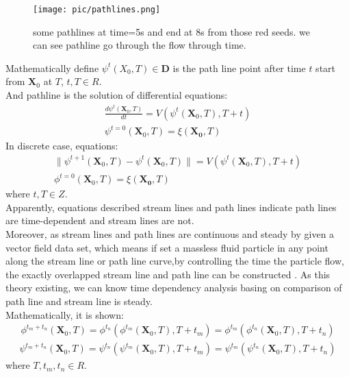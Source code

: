 \documentclass[
     11pt,         %
     a4paper,      %
     oneside,
     ]{article}
\newcommand{\vect}[1]{\boldsymbol{#1}}
\begin{document}
	\begin{figure}[H]
			\centering
			\texttt{[image: pic/pathlines.png]}
			\caption{{\tiny some pathlines at time=5s and end at 8s from those red seeds. we can see pathline go through the flow through time.}}
			\label{fig:pathlineatfrom5s}
		\end{figure}
	Mathematically define $\psi^{t}(X_{0},T)\in\vect{D}$ is the path line point after time $t$ start from $\vect{X}_{0}$ at $T$, $t,T\in R$.\\
	And pathline is the solution of differential equations:\\
    \begin{eqnarray}
    \frac{d\psi^{t}(\vect{X}_{0},T)}{dt}=V(\psi^{t}(\vect{X}_{0},T),T+t)\\
    \psi^{t=0}(\vect{X}_{0},T)=\xi(\vect{X_{0}},T)
    \end{eqnarray}
    In discrete case, equations:\\
    \begin{eqnarray}
    \lVert\psi^{t+1}(\vect{X}_{0},T)-\psi^{t}(\vect{X}_{0},T)\rVert=V(\psi^{t}(\vect{X}_{0},T),T+t)\\
    \phi^{t=0}(\vect{X}_{0},T)=\xi(\vect{X_{0}},T)
    \end{eqnarray}
    where $t,T\in Z$.\\ 
    Apparently, equations described stream lines and path lines indicate path lines are time-dependent and stream lines are not.\\
	Moreover, as stream lines and path lines are continuous and steady by given a vector field data set, which means if set a massless fluid particle in any point along the stream line or path line curve,by controlling the time the particle flow, the exactly overlapped stream line and path line can be constructed . As this theory existing, we can know time dependency analysis basing on comparison of path line and stream line is steady.\\
	Mathematically, it is shown:\\
	\begin{eqnarray}
	\phi^{t_{m}+t_{n}}(\vect{X}_{0},T)=\phi^{t_{n}}(\phi^{t_{m}}(\vect{X}_{0},T),T+t_{m})=\phi^{t_{m}}(\phi^{t_{n}}(\vect{X}_{0},T),T+t_{n})
	\end{eqnarray}
	\begin{eqnarray}
	\psi^{t_{m}+t_{n}}(\vect{X}_{0},T)=\psi^{t_{n}}(\psi^{t_{m}}(\vect{X}_{0},T),T+t_{m})=\psi^{t_{m}}(\psi^{t_{n}}(\vect{X}_{0},T),T+t_{n})
	\end{eqnarray}
	where $T,t_{m},t_{n}\in R$.
\end{document}
